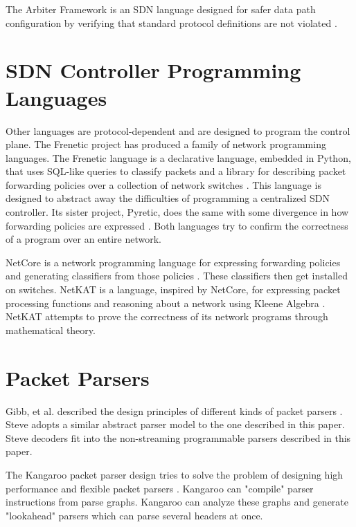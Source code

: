 The Arbiter Framework is an SDN language designed for safer data path configuration by verifying that standard protocol definitions are not violated \cite{noproto1}.

\section{SDN Controller Programming Languages} \label{rel:frenetic}

Other languages are protocol-dependent and are designed to program the control plane. The Frenetic project has produced a family of network programming
languages. The Frenetic language is a declarative language, embedded in Python,
that uses SQL-like queries to classify packets and a library for describing
packet forwarding policies over a collection of network switches
\cite{foster2011frenetic, foster2013frenetic}. This language is designed to
abstract away the difficulties of programming a centralized SDN controller. Its
sister project, Pyretic, does the same with some divergence in how forwarding
policies are expressed \cite{modularpyretic}. Both languages try to confirm the correctness of a program over an entire network.

NetCore is a network programming language for expressing forwarding policies and
generating classifiers from those policies \cite{monsanto2012netcore}. These
classifiers then get installed on switches. NetKAT is a language, inspired by
NetCore, for expressing packet processing functions and reasoning about a
network using Kleene Algebra \cite{kozen2014netkat, anderson2014netkat}. NetKAT
attempts to prove the correctness of its network programs through mathematical theory.

\section{Packet Parsers}

Gibb, et al. described the design principles of different kinds of packet parsers \cite{parser2013gibb}. Steve adopts a similar abstract parser model to the one described in this paper. Steve decoders fit into the non-streaming programmable parsers described in this paper. 

The Kangaroo packet parser design tries to solve the problem of designing high performance and flexible packet parsers \cite{kangaroo}. Kangaroo can "compile" parser instructions from parse graphs. Kangaroo can analyze these graphs and generate "lookahead" parsers which can parse several headers at once.

